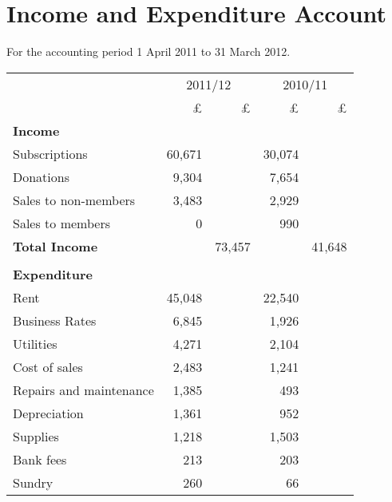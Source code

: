 \section{Income and Expenditure Account}
For the accounting period 1 April 2011 to 31 March 2012.

\begin{center}
\begin{tabular}{ l  r  r r r }
\toprule
            & \multicolumn{2}{c}{2011/12}  & \multicolumn{2}{c}{2010/11} \\
\cmidrule(r){2-3} \cmidrule(r){4-5}
                                  & £       & £       & £      & £          \\
{\bf Income}                      &         &         &        &            \\
Subscriptions                     & 60,671  &         & 30,074 &            \\
Donations                         & 9,304   &         & 7,654  &            \\
Sales to non-members              & 3,483   &         & 2,929  &            \\
Sales to members                  & 0       &         & 990    &            \\
{\bf Total Income}                &         & 73,457  &        & 41,648     \\
\cmidrule(r){2-3} \cmidrule(r){4-5} \\
{\bf Expenditure}                 &         &         &        &              \\
Rent                              & 45,048  &         & 22,540 &              \\
Business Rates                    & 6,845   &         & 1,926  &        \\
Utilities                         & 4,271   &         & 2,104  &        \\
Cost of sales                     & 2,483   &         & 1,241  &        \\
Repairs and maintenance           & 1,385   &         & 493    &              \\
Depreciation                      & 1,361   &         & 952    &        \\
Supplies                          & 1,218   &         & 1,503  &        \\
Bank fees                         & 213     &         & 203    &        \\
Sundry                            & 260     &         & 66     &        \\

\end{tabular}
\end{center}
